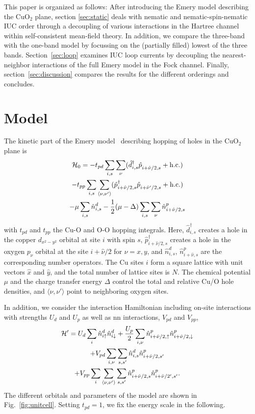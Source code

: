 \documentclass[prb, twocolumn,showpacs,preprintnumbers,amsmath,amssymb, floatfix]{revtex4}
\begin{document}
This paper is organized as follows: After introducing the Emery model describing the CuO$_{2}$ plane, section \ref{sec:static} deals with nematic and nematic-spin-nematic IUC order through a decoupling of various interactions in the Hartree channel within self-consistent mean-field theory.  
In addition, we compare the three-band with the one-band model by focussing on the (partially filled) lowest of the three bands. 
Section~\ref{sec:loop} examines IUC loop currents by decoupling the nearest-neighbor interactions of the full Emery model in the Fock channel. Finally, section~\ref{sec:discussion} compares the results for the different orderings and concludes.  
\section{Model}
\label{sec:model}
The kinetic part of the Emery model~\cite{emery:1987} describing hopping
of holes in the CuO$_2$ plane is
\begin{multline}
  \mathcal{H}_{0} = -t_{pd}\sum_{i,s}\sum_\nu(\hat{d}^{\dag}_{i,s}\hat{p}^{\phantom{\dag}}_{ i+\hat{\nu}/2, s} + {\rm h.c.})\\
  - t_{pp}\sum_{i, s}\sum_{\langle\nu,\nu'\rangle}(\hat{p}^{\dag}_{ i+\hat{\nu}/2, s}\hat{p}^{\phantom{\dag}}_{ i+\hat{\nu}'/2, s} + {\rm h.c.})\\ 
  - \mu \sum_{i,s}\hat{n}^{d}_{i,s} - \frac12(\mu - \Delta)\sum_{i,s}\sum_{\nu}\hat{n}^{p}_{i+\hat{\nu}/2,s}
  \label{eq:hopping}
\end{multline}
with $t_{pd}$ and $t_{pp}$ the Cu-O and O-O hopping integrals. Here, $\hat{d}^{\dag}_{i,s}$ creates a hole
in the copper $d_{x^2-y^2}$ orbital at site $i$ with spin $s$,
$\hat{p}^{\dag}_{ i+\hat{\nu}/2, s}$ creates a hole in the oxygen $p_\nu$ orbital
at the site $i+\hat{\nu}/2$
for $\nu = x, y$, and
$\hat{n}^{d}_{i,s}$,
$\hat{n}^{p}_{ i+\hat{\nu}, s}$
are the corresponding number operators.
The Cu sites $i$ form a square
lattice with unit vectors $\hat{x}$ and $\hat{y}$, and the total number of lattice sites is $N$. The chemical potential $\mu$
and the charge transfer energy $\Delta$ control the total and relative
Cu/O hole densities, and $\langle\nu, \nu'\rangle$ point to neighboring oxygen sites.

In addition, we consider the interaction Hamiltonian including on-site interactions with strengths $U_{d}$ and $U_{p}$ as well as nn interactions, $V_{pd}$ and $V_{pp}$,
\begin{multline}
  \mathcal{H}' = U_{d}\sum_{i}\hat{n}_{i\uparrow}^{d}\hat{n}_{i\downarrow}^{d} + \frac{U_{p}}{2}\sum_{i, \nu}\hat{n}_{ i+\hat{\nu}/2,\uparrow}^{p}\hat{n}_{ i+\hat{\nu}/2,\downarrow}^{p}\\
  + V_{pd}\sum_{i, \nu}\sum_{s, s'}\hat{n}_{i,s}^{d}\hat{n}_{ i+\hat{\nu}/2, s'}^{p}\\
  + V_{pp}\sum_{i}\sum_{\langle\nu,\nu'\rangle}\sum_{s,s'}\hat{n}_{ i+\hat{\nu}/2, s}^{p}\hat{n}_{i+\hat{\nu}/2',s'}^{p}.
  \label{eq:interaction}
\end{multline}
The different orbitals and parameters of the model are shown in
Fig.~\ref{fig:unitcell}. Setting $t_{pd}=1$, we fix the energy scale
in the following.
\end{document}

